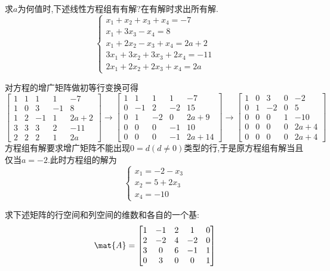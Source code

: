 \documentclass{ctexart}
\begin{document}
\pagestyle{empty}
\begin{center}
\end{center}
\begin{homework}[1(20')]
    求$a$为何值时,下述线性方程组有有解?在有解时求出所有解.
    \[\left\{\begin{array}{l}
        x_1+x_2+x_3+x_4=-7\\
        x_1+3x_3-x_4=8\\
        x_1+2x_2-x_3+x_4=2a+2\\
        3x_1+3x_2+3x_3+2x_4=-11\\
        2x_1+2x_2+2x_3+x_4=2a
    \end{array}\right.\]
\end{homework}
\begin{solution}
    对方程的增广矩阵做初等行变换可得
    \[\begin{bmatrix}
        1&1&1&1&-7\\
        1&0&3&-1&8\\
        1&2&-1&1&2a+2\\
        3&3&3&2&-11\\
        2&2&2&1&2a
    \end{bmatrix}\longrightarrow\begin{bmatrix}
        1&1&1&1&-7\\
        0&-1&2&-2&15\\
        0&1&-2&0&2a+9\\
        0&0&0&-1&10\\
        0&0&0&-1&2a+14
    \end{bmatrix}\longrightarrow\begin{bmatrix}
        1&0&3&0&-2\\
        0&1&-2&0&5\\
        0&0&0&1&-10\\
        0&0&0&0&2a+4\\
        0&0&0&0&2a+4
    \end{bmatrix}\]
    方程组有解要求增广矩阵不能出现$0=d(d\neq 0)$类型的行,于是原方程组有解当且仅当$a=-2$.此时方程组的解为
    \[\left\{\begin{array}{l}
        x_1=-2-x_3\\
        x_2=5+2x_3\\
        x_4=-10
    \end{array}\right.\]
\end{solution}
\begin{homework}[2(20')]
    求下述矩阵的行空间和列空间的维数和各自的一个基:
    \[\mat{A}=\begin{bmatrix}
        1&-1&2&1&0\\
        2&-2&4&-2&0\\
        3&0&6&-1&1\\
        0&3&0&0&1
    \end{bmatrix}\]
\end{homework}
\end{document}
